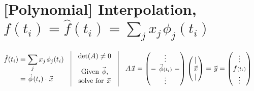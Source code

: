 \documentclass[12pt]{article}
\newcommand{\hs}{\hspace{1pt}}
\newcommand{\hsvec}[1]{\vec{\hs #1}}
\begin{document}
\section{[Polynomial] Interpolation, \(f(t_i) = \hat{f}(t_i) = \sum_j x_j \hs \phi_j(t_i) \)}

\(
    \begin{aligned}
        \hat{f}(t_i) &= \sum_j x_j \hs \phi_j(t_i)\\
        &= \hsvec{\phi}\hs(t_i) \cdot \hsvec{x}
    \end{aligned}
    \hspace{10pt}
    \vline
    \hspace{10pt}
    \begin{gathered}
        \det(A) \neq 0\\[5pt]
        \text{Given } \hsvec{\phi},\\[-2pt]
        \text{solve for } \hsvec{x}
    \end{gathered}
    \hspace{10pt}
    \vline
    \hspace{10pt}
    \begin{aligned}
        &A\hsvec{x} 
            = \left(\begin{matrix}
                \vdots\\
                - \ \hsvec{\phi}{\scriptstyle(t_i)} \ -\\
                \vdots
            \end{matrix}\right)
            \left(\begin{matrix}
                |\\
                \hsvec{x}\\
                |
            \end{matrix}\right)
            = \hsvec{y} = \left(\begin{matrix}
                \vdots\\
                f{\scriptstyle(t_i)}\\
                \vdots
            \end{matrix}\right)
    \end{aligned}
\)
\end{document}

